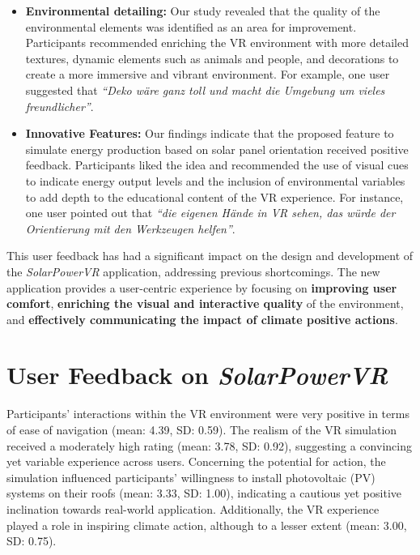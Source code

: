 \documentclass[draft, final]{vutinfth} %
\begin{document}
\begin{itemize}
    \item \textbf{Environmental detailing:} Our study revealed that the quality of the environmental elements was identified as an area for improvement. Participants recommended enriching the VR environment with more detailed textures, dynamic elements such as animals and people, and decorations to create a more immersive and vibrant environment. For example, one user suggested that \textit{``Deko wäre ganz toll und macht die Umgebung um vieles freundlicher''}.

    \item \textbf{Innovative Features:} Our findings indicate that the proposed feature to simulate energy production based on solar panel orientation received positive feedback. Participants liked the idea and recommended the use of visual cues to indicate energy output levels and the inclusion of environmental variables to add depth to the educational content of the VR experience. For instance, one user pointed out that \textit{``die eigenen Hände in VR sehen, das würde der Orientierung mit den Werkzeugen helfen''}.
\end{itemize}

This user feedback has had a significant impact on the design and development of the \textit{SolarPowerVR} application, addressing previous shortcomings. The new application provides a user-centric experience by focusing on \textbf{improving user comfort}, \textbf{enriching the visual and interactive quality} of the environment, and \textbf{effectively communicating the impact of climate positive actions}.

\section{User Feedback on \textit{SolarPowerVR}}
Participants' interactions within the VR environment were very positive in terms of ease of navigation (mean: 4.39, SD: 0.59).
The realism of the VR simulation received a moderately high rating (mean: 3.78, SD: 0.92), suggesting a convincing yet variable experience across users.
Concerning the potential for action, the simulation influenced participants' willingness to install photovoltaic (PV) systems on their roofs (mean: 3.33, SD: 1.00), indicating a cautious yet positive inclination towards real-world application.
Additionally, the VR experience played a role in inspiring climate action, although to a lesser extent (mean: 3.00, SD: 0.75).
\end{document}

